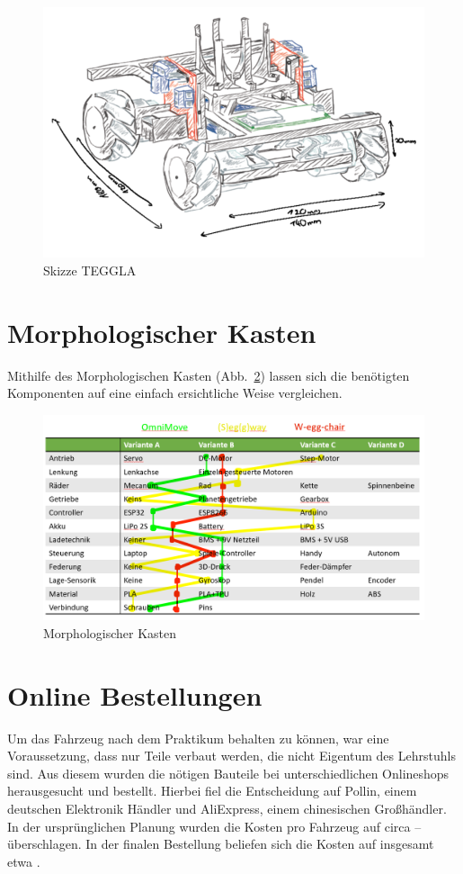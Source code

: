 \begin{figure}[!ht]
	\centering
	\includegraphics[width=\textwidth]{bilder/tegglaskizze.png}
	\caption{Skizze TEGGLA}
	\label{bild:tegglaskizze}
\end{figure}


\section{Morphologischer Kasten}
Mithilfe des Morphologischen Kasten (Abb.~\ref{bild:morphkasten}) lassen sich die benötigten Komponenten auf eine einfach ersichtliche Weise vergleichen.
\begin{figure}[H]
	\centering
	\includegraphics[width=\textwidth]{bilder/morphkasten.png}
	\caption{Morphologischer Kasten}
	\label{bild:morphkasten}
\end{figure}

\section{Online Bestellungen}
Um das Fahrzeug nach dem Praktikum behalten zu können, war eine Voraussetzung, dass nur Teile verbaut werden, die nicht Eigentum des Lehrstuhls sind.
Aus diesem wurden die nötigen Bauteile bei unterschiedlichen Onlineshops herausgesucht und bestellt.
Hierbei fiel die Entscheidung auf Pollin, einem deutschen Elektronik Händler und AliExpress, einem chinesischen Großhändler.
In der ursprünglichen Planung wurden die Kosten pro Fahrzeug auf circa  --  überschlagen.
In der finalen Bestellung beliefen sich die Kosten auf insgesamt etwa .

